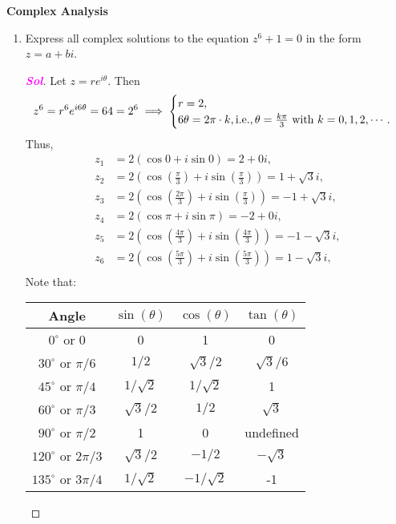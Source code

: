 \documentclass{article}
\newcommand{\ie}{\textnormal{i.e.}}
\theoremstyle{definition}
\newcommand{\of}[1]{\left( #1 \right)}
\newcommand{\sol}{\textcolor{magenta}{\bf Sol}}
\begin{document}
	\begin{center}
		\huge\textbf{Complex Analysis}\\
		\vspace{0.5em}
	\end{center}
	
	\begin{enumerate}
		\item Express all complex solutions to the equation $z^6 + 1 = 0$ in the form $z = a + bi$.
		\begin{proof}[\sol]
			Let $z=re^{i\theta}$. Then \[
			z^6=r^6e^{i 6\theta}=64=2^6\implies\begin{cases}
			r = 2,\\
			6\theta = 2\pi\cdot k, \ie, \theta=\frac{k\pi}{3}\ \text{with}\ k=0,1,2,\cdots.
			\end{cases}
			\] Thus, \begin{align*}
			z_1&=2\of{\cos 0+i\sin 0}=2+0i,\\
			z_2&=2\of{\cos\of{\frac{\pi}{3}}+i\sin\of{\frac{\pi}{3}}}=1+\sqrt{3}i,\\
			z_3&=2\of{\cos\of{\frac{2\pi}{3}}+i\sin\of{\frac{\pi}{3}}}=-1+\sqrt{3}i,\\
			z_4&=2\of{\cos\pi+i\sin\pi}=-2+0i,\\
			z_5&=2\of{\cos\of{\frac{4\pi}{3}}+i\sin\of{\frac{4\pi}{3}}}=-1-\sqrt{3}i,\\
			z_6&=2\of{\cos\of{\frac{5\pi}{3}}+i\sin\of{\frac{5\pi}{3}}}=1-\sqrt{3}i,\\
			\end{align*}
			Note that: \begin{table}[ht!]
				\centering
				\begin{tabular}{c||c|c|c}
					\toprule
					Angle & $\sin(\theta)$ & $\cos(\theta)$ & $\tan(\theta)$ \\
					\midrule
					$0^\circ$ or $0$ & 0 & 1 & 0 \\
					$30^\circ$ or ${\pi}/{6}$ & ${1}/{2}$ & ${\sqrt{3}}/{2}$ & ${\sqrt{3}}/{6}$ \\
					$45^\circ$ or ${\pi}/{4}$ & ${1}/{\sqrt{2}}$ & ${1}/{\sqrt{2}}$ & 1 \\
					$60^\circ$ or ${\pi}/{3}$ & ${\sqrt{3}}/{2}$ & ${1}/{2}$ & $\sqrt{3}$ \\
					$90^\circ$ or ${\pi}/{2}$ & 1 & 0 & undefined \\
					$120^\circ$ or ${2\pi}/{3}$ & ${\sqrt{3}}/{2}$ & $-{1}/{2}$ & $-\sqrt{3}$ \\
					$135^\circ$ or ${3\pi}/{4}$ & ${1}/{\sqrt{2}}$ & $-{1}/{\sqrt{2}}$ & -1 \\

\end{tabular}
\end{table}
\end{proof}
\end{enumerate}
\end{document}
